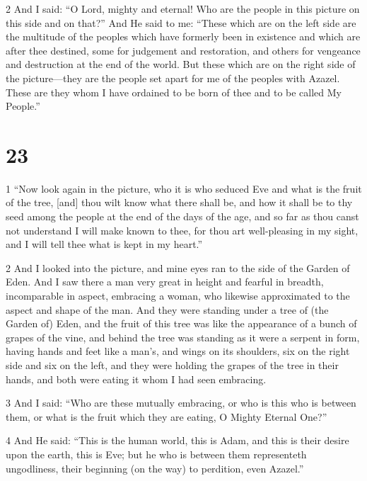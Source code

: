 \par 2 And I said: “O Lord, mighty and eternal! Who are the people in this picture on this side and on that?” And He said to me: “These which are on the left side are the multitude of the peoples which have formerly been in existence and which are after thee destined, some for judgement and restoration, and others for vengeance and destruction at the end of the world. But these which are on the right side of the picture—they are the people set apart for me of the peoples with Azazel. These are they whom I have ordained to be born of thee and to be called My People.”

\chapter{23}

\par 1 “Now look again in the picture, who it is who seduced Eve and what is the fruit of the tree, [and] thou wilt know what there shall be, and how it shall be to thy seed among the people at the end of the days of the age, and so far as thou canst not understand I will make known to thee, for thou art well-pleasing in my sight, and I will tell thee what is kept in my heart.”

\par 2 And I looked into the picture, and mine eyes ran to the side of the Garden of Eden. And I saw there a man very great in height and fearful in breadth, incomparable in aspect, embracing a woman, who likewise approximated to the aspect and shape of the man. And they were standing under a tree of (the Garden of) Eden, and the fruit of this tree was like the appearance of a bunch of grapes of the vine, and behind the tree was standing as it were a serpent in form, having hands and feet like a man's, and wings on its shoulders, six on the right side and six on the left, and they were holding the grapes of the tree in their hands, and both were eating it whom I had seen embracing.

\par 3 And I said: “Who are these mutually embracing, or who is this who is between them, or what is the fruit which they are eating, O Mighty Eternal One?”

\par 4 And He said: “This is the human world, this is Adam, and this is their desire upon the earth, this is Eve; but he who is between them representeth ungodliness, their beginning (on the way) to perdition, even Azazel.”

